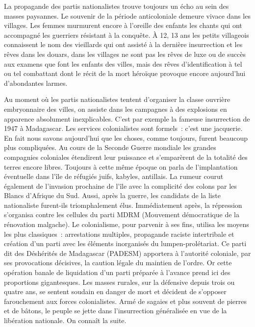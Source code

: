 \documentclass[french,twoside]{book} %
\begin{document}
La propagande des partis nationalistes trouve toujours un écho au sein des masses paysannes. Le souvenir de la période anticoloniale demeure vivace dans les villages. Les femmes murmurent encore à l’oreille des enfants les chants qui ont accompagné les guerriers résistant à la conquête. À 12, 13 ans les petits villageois connaissent le nom des vieillards qui ont assisté à la dernière insurrection et les rêves dans les douars, dans les villages ne sont pas les rêves de luxe ou de succès aux examens que font les enfants des villes, mais des rêves d’identification à tel ou tel combattant dont le récit de la mort héroïque provoque encore aujourd’hui d’abondantes larmes.\par
\bigbreak
\noindent Au moment où les partis nationalistes tentent d’organiser la classe ouvrière embryonnaire des villes, on assiste dans les campagnes à des explosions en apparence absolument inexplicables. C’est par exemple la fameuse insurrection de 1947 à Madagascar. Les services colonialistes sont formels : c’est une jacquerie. En fait nous savons aujourd’hui que les choses, comme toujours, furent beaucoup plus compliquées. Au cours de la Seconde Guerre mondiale les grandes compagnies coloniales étendirent leur puissance et s’emparèrent de la totalité des terres encore libres. Toujours à cette même époque on parla de l’implantation éventuelle dans l’île de réfugiés juifs, kabyles, antillais. La rumeur courut également de l’invasion prochaine de l’île avec la complicité des colons par les Blancs d’Afrique du Sud. Aussi, après la guerre, les candidats de la liste nationaliste furent-ils triomphalement élus. Immédiatement après, la répression s’organisa contre les cellules du parti MDRM (Mouvement démocratique de la rénovation malgache). Le colonialisme, pour parvenir à ses fins, utilisa les moyens les plus classiques : arrestations multiples, propagande raciste intertribale et création d’un parti avec les éléments inorganisés du lumpen-prolétariat.   Ce parti dit des Déshérités de Madagascar (PADESM) apportera à l’autorité coloniale, par ses provocations décisives, la caution légale du maintien de l’ordre. Or cette opération banale de liquidation d’un parti préparée à l’avance prend ici des proportions gigantesques. Les masses rurales, sur la défensive depuis trois ou quatre ans, se sentent soudain en danger de mort et décident de s’opposer farouchement aux forces colonialistes. Armé de sagaies et plus souvent de pierres et de bâtons, le peuple se jette dans l’insurrection généralisée en vue de la libération nationale. On connaît la suite.\par
\end{document}
